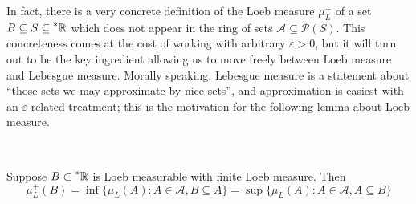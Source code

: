 \documentclass[11pt]{amsart}
\theoremstyle{remark}
\newcommand{\hyp}[1][\mathbb{R}]{\prescript{*}{}{#1}}
\newcommand{\powerset}{\mathcal{P}}
\begin{document}
In fact, there is a very concrete definition of the Loeb measure $\mu_L^+$ of a set $B \subseteq S \subseteq \hyp$ which does not appear in the ring of sets $\mathcal{A} \subseteq \powerset(S)$.
This concreteness comes at the cost of working with arbitrary $\varepsilon > 0$, but it will turn out to be the key ingredient allowing us to move freely between Loeb measure and Lebesgue measure.
Morally speaking, Lebesgue measure is a statement about ``those sets we may approximate by nice sets'', and approximation is easiest with an $\varepsilon$-related treatment; this is the motivation for the following lemma about Loeb measure.

\

\begin{lemma} \label{lemma:loebsup} Suppose $B \subset \hyp$ is Loeb measurable with finite Loeb measure.
Then $$\mu_L^+(B) = \inf \{ \mu_L(A) : A \in \mathcal{A}, B \subseteq A \} = \sup \{ \mu_L(A) : A \in \mathcal{A}, A \subseteq B \} $$
\end{lemma}
\end{document}

